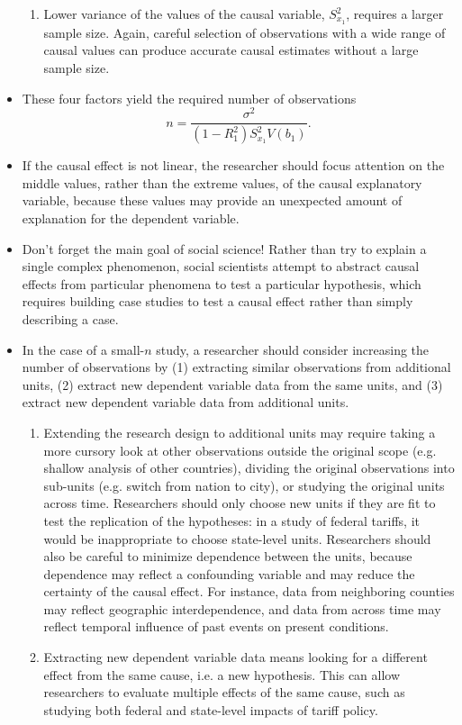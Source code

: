 \documentclass[11pt,letterpaper]{article}
\begin{document}
\begin{itemize}
\begin{enumerate}
\item Lower variance of the values of the causal variable, $S^{2}_{x_{1}}$, requires a larger sample size. Again, careful selection of observations with a wide range of causal values can produce accurate causal estimates without a large sample size.
\end{enumerate}
\item These four factors yield the required number of observations $$n = \frac{\sigma^{2}}{(1-R^{2}_{1}) S^{2}_{x_{1}} V(b_{1})}.$$
\item If the causal effect is not linear, the researcher should focus attention on the middle values, rather than the extreme values, of the causal explanatory variable, because these values may provide an unexpected amount of explanation for the dependent variable.
\item Don't forget the main goal of social science! Rather than try to explain a single complex phenomenon, social scientists attempt to abstract causal effects from particular phenomena to test a particular hypothesis, which requires building case studies to test a causal effect rather than simply describing a case. 
\item In the case of a small-$n$ study, a researcher should consider increasing the number of observations by (1) extracting similar observations from additional units, (2) extract new dependent variable data from the same units, and (3) extract new dependent variable data from additional units.
\begin{enumerate}
\item Extending the research design to additional units may require taking a more cursory look at other observations outside the original scope (e.g. shallow analysis of other countries), dividing the original observations into sub-units (e.g. switch from nation to city), or studying the original units across time. Researchers should only choose new units if they are fit to test the replication of the hypotheses: in a study of federal tariffs, it would be inappropriate to choose state-level units. Researchers should also be careful to minimize dependence between the units, because dependence may reflect a confounding variable and may reduce the certainty of the causal effect. For instance, data from neighboring counties may reflect geographic interdependence, and data from across time may reflect temporal influence of past events on present conditions. 
\item Extracting new dependent variable data means looking for a different effect from the same cause, i.e. a new hypothesis. This can allow researchers to evaluate multiple effects of the same cause, such as studying both federal and state-level impacts of tariff policy.

\end{enumerate}
\end{itemize}
\end{document}
